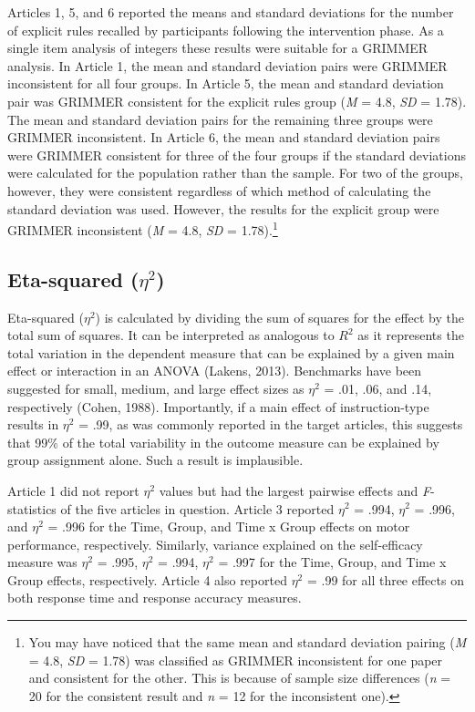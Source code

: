\documentclass[
  english,
  man, donotrepeattitle,floatsintext]{apa7}
\begin{document}
Articles 1, 5, and 6 reported the means and standard deviations for the number of explicit rules recalled by participants following the intervention phase. As a single item analysis of integers these results were suitable for a GRIMMER analysis. In Article 1, the mean and standard deviation pairs were GRIMMER inconsistent for all four groups. In Article 5, the mean and standard deviation pair was GRIMMER consistent for the explicit rules group (\emph{M} = 4.8, \emph{SD} = 1.78). The mean and standard deviation pairs for the remaining three groups were GRIMMER inconsistent. In Article 6, the mean and standard deviation pairs were GRIMMER consistent for three of the four groups if the standard deviations were calculated for the population rather than the sample. For two of the groups, however, they were consistent regardless of which method of calculating the standard deviation was used. However, the results for the explicit group were GRIMMER inconsistent (\emph{M} = 4.8, \emph{SD} = 1.78).\footnote{You may have noticed that the same mean and standard deviation pairing (\emph{M} = 4.8, \emph{SD} = 1.78) was classified as GRIMMER inconsistent for one paper and consistent for the other. This is because of sample size differences (\emph{n} = 20 for the consistent result and \emph{n} = 12 for the inconsistent one).}

\hypertarget{eta-squared-eta2-1}{%
\subsection{\texorpdfstring{Eta-squared (\(\eta^{2}\))}{Eta-squared (\textbackslash eta\^{}\{2\})}}\label{eta-squared-eta2-1}}

Eta-squared (\(\eta^{2}\)) is calculated by dividing the sum of squares for the effect by the total sum of squares. It can be interpreted as analogous to \(R^{2}\) as it represents the total variation in the dependent measure that can be explained by a given main effect or interaction in an ANOVA (Lakens, 2013). Benchmarks have been suggested for small, medium, and large effect sizes as \(\eta^{2}\) = .01, .06, and .14, respectively (Cohen, 1988). Importantly, if a main effect of instruction-type results in \(\eta^{2}\) = .99, as was commonly reported in the target articles, this suggests that 99\% of the total variability in the outcome measure can be explained by group assignment alone. Such a result is implausible.

Article 1 did not report \(\eta^{2}\) values but had the largest pairwise effects and \emph{F}-statistics of the five articles in question. Article 3 reported \(\eta^{2}\) = .994, \(\eta^{2}\) = .996, and \(\eta^{2}\) = .996 for the Time, Group, and Time x Group effects on motor performance, respectively. Similarly, variance explained on the self-efficacy measure was \(\eta^{2}\) = .995, \(\eta^{2}\) = .994, \(\eta^{2}\) = .997 for the Time, Group, and Time x Group effects, respectively. Article 4 also reported \(\eta^{2}\) = .99 for all three effects on both response time and response accuracy measures.
\end{document}
